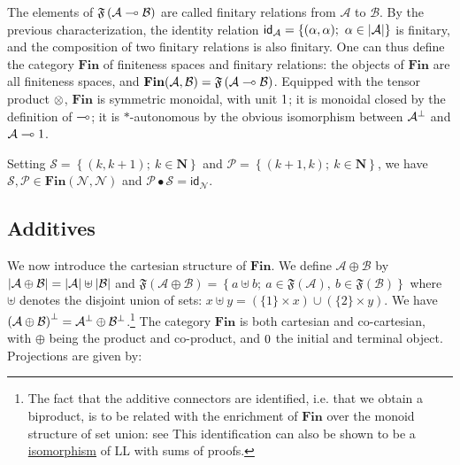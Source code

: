 The elements of
\(\mathfrak F\left({\mathcal A}\multimap{\mathcal B}\right)\) are called
finitary relations from \({\mathcal A}\) to \({\mathcal B}\). By the
previous characterization, the identity relation
\(\mathsf{id}_{{\mathcal A}} = \left\{(\alpha,\alpha);\  \alpha\in\left|{\mathcal A}\right|\right\}\)
is finitary, and the composition of two finitary relations is also
finitary. One can thus define the category \(\mathbf{Fin}\) of
finiteness spaces and finitary relations: the objects of
\(\mathbf{Fin}\) are all finiteness spaces, and
\(\mathbf{Fin}({\mathcal A},{\mathcal B})=\mathfrak F\left({\mathcal A}\multimap{\mathcal B}\right)\).
Equipped with the tensor product \(\otimes\), \(\mathbf{Fin}\) is
symmetric monoidal, with unit \(1\); it is monoidal closed by the
definition of \(\multimap\); it is \(*\)-autonomous by the obvious
isomorphism between \({\mathcal A}^\bot\) and \({\mathcal A}\multimap1\).

\begin{example}\label{example.-1}
Setting \(\mathcal{S}=\left\{(k,k+1);\  k\in{\mathbf N}\right\}\) and \(\mathcal{P}=\left\{(k+1,k);\  k\in{\mathbf N}\right\}\), we have \(\mathcal{S},\mathcal{P}\in\mathbf{Fin}({\mathcal N},{\mathcal N})\) and \(\mathcal{P}\bullet\mathcal{S}=\mathsf{id}_{{\mathcal N}}\).
\end{example}

\subsection{Additives}\label{additives}

We now introduce the cartesian structure of \(\mathbf{Fin}\). We define
\({\mathcal A} \oplus {\mathcal B}\) by
\(\left|{\mathcal A} \oplus {\mathcal B}\right| = \left|\mathcal A\right| \uplus \left|\mathcal B\right|\)
and
\(\mathfrak F\left({\mathcal A} \oplus {\mathcal B}\right) = \left\{ a\uplus b;\  a\in \mathfrak F\left(\mathcal A\right),\ b\in\mathfrak F\left(\mathcal B\right)\right\}\)
where \(\uplus\) denotes the disjoint union of sets:
\(x\uplus y=(\{1\}\times x)\cup(\{2\}\times y)\). We have
\(\left({\mathcal A}\oplus {\mathcal B}\right)^\bot = {\mathcal A}^\bot\oplus{\mathcal B}^\bot\).\footnote{The
  fact that the additive connectors are identified, i.e. that we obtain
  a biproduct, is to be related with the enrichment of \(\mathbf{Fin}\)
  over the monoid structure of set union: see This identification can
  also be shown to be a \url{isomorphism} of LL with sums of proofs.}
The category \(\mathbf{Fin}\) is both cartesian and co-cartesian, with
\(\oplus\) being the product and co-product, and \(0\) the initial
and terminal object. Projections are given by:

